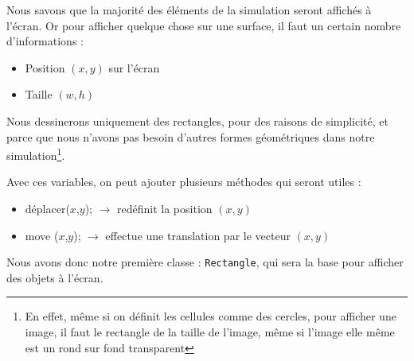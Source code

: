 Nous savons que la majorité des éléments de la simulation seront affichés à l'écran.
Or pour afficher quelque chose sur une surface, il faut un certain nombre d'informations : 
\begin{itemize}
  \item Position $(x,y)$ sur l'écran
  \item Taille $(w,h)$
\end{itemize}

Nous dessinerons uniquement des rectangles, pour des raisons de simplicité, et parce que nous n'avons pas besoin d'autres formes géométriques dans notre simulation\footnote{En effet, même si on définit les cellules comme des cercles, pour afficher une image, il faut le rectangle de la taille de l'image, même si l'image elle même est un rond sur fond transparent}.

Avec ces variables, on peut ajouter plusieurs méthodes qui seront utiles :
\begin{itemize}
  \item déplacer($x$,$y$); $\rightarrow$ redéfinit la position $(x,y)$
  \item move ($x$,$y$); $\rightarrow$ effectue une translation par le vecteur $(x,y)$
\end{itemize}


Nous avons donc notre première classe : \texttt{Rectangle}, qui sera la base pour afficher des objets à l'écran.
